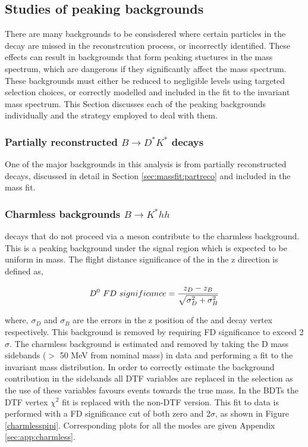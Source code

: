\subsection{Studies of peaking backgrounds}
\label{sec:backgrounds}

There are many backgrounds to be consisdered where certain particles in the decay are missed in the reconstrcution process, or incorrectly identified. These effects can result in backgrounds that form peaking stuctures in the \B mass spectrum, which are dangerous if they significantly affect the \B mass spectrum. These backgrounds must either be reduced to negligible levels using targeted selection choices, or correctly modelled and included in the fit to the invariant \B mass spectrum. This Section discusses each of the peaking backgrounds individually and the strategy employed to deal with them.

\subsubsection{Partially reconstructed \boldmath$B \to D^*K^*$ decays}
\label{sec:backgrounds:partreco}

One of the major backgrounds in this analysis is from partially reconstructed \decay{\B}{\Dstar\Kstar} decays, discussed in detail in Section \ref{sec:massfit:partreco} and included in the mass fit.

\subsubsection{Charmless backgrounds \boldmath$B \to K^*hh$}
\label{sec:backgrounds:charmless}

\B decays that do not proceed via a \D meson contribute to the charmless background. This is a peaking background under the signal region which is expected to be uniform in \D mass. The flight distance significance of the \Dz in the z direction is defined as,

\begin{equation}
{\ensuremath{{D}^0}}\ FD\ significance = \frac{z_D - z_B}{\sqrt{\sigma_D^2 + \sigma_B^2}}
\label{FDdefinition}
\end{equation}

where, $\sigma_D$ and $\sigma_B$ are the errors in the z position of the \D and \B decay vertex respectively. This background is removed by requiring \Dz FD significance to exceed 2$\sigma$. The charmless background is estimated and removed by taking the D mass sidebands ($>$ 50 MeV from nominal \D mass) in data and performing a fit to the invariant \B mass distribution. In order to correctly estimate the background contribution in the \D sidebands all DTF variables are replaced in the selection as the use of these variables favours events towards the true \D mass. In the BDTs the DTF vertex $\chi^2$ fit is replaced with the non-DTF version. This fit to data is performed with a FD significance cut of both zero and 2$\sigma$, as shown in Figure \ref{charmlesspipi}. Corresponding plots for all the modes are given Appendix \ref{sec:app:charmless}.

